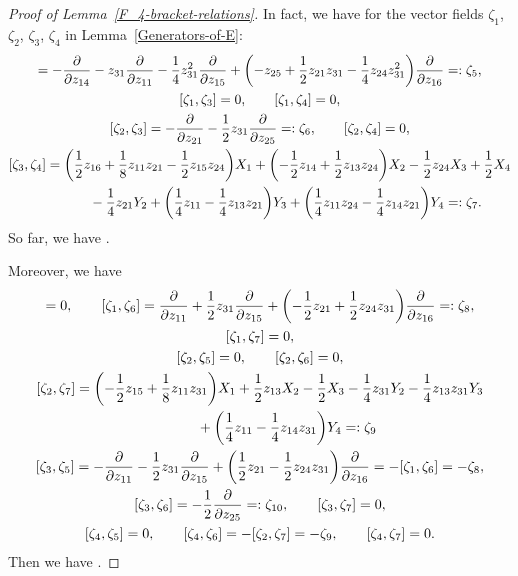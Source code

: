 \documentclass[pdftex]{sigma}
\numberwithin{equation}{section}
\theoremstyle{definition}
\newcommand{\0}{\boldsymbol{0}}
\newcommand{\pa}{\partial}
\newcommand{\rank}{\operatorname{rank}}
\begin{document}
\begin{proof}[Proof of Lemma~\ref{F_4-bracket-relations}]
In fact, we have for the vector fields $\zeta_1$, $\zeta_2$, $\zeta_3$, $\zeta_4$ in Lemma~\ref{Generators-of-E}:
\begin{gather*}
[\zeta_1, \zeta_2] = - \frac{\pa}{\pa z_{14}} - z_{31}\frac{\pa}{\pa z_{11}} - \frac{1}{4}z_{31}^2\frac{\pa}{\pa z_{15}}
+ \biggl(
- z_{25} + \frac{1}{2}z_{21}z_{31} - \frac{1}{4}z_{24}z_{31}^2\biggr)\frac{\pa}{\pa z_{16}} =: \zeta_5,
\\
[\zeta_1, \zeta_3] = 0,\qquad [\zeta_1, \zeta_4] = 0,
\\
[\zeta_2, \zeta_3] = - \frac{\pa}{\pa z_{21}} - \frac{1}{2}z_{31}\frac{\pa}{\pa z_{25}} =: \zeta_6,
\qquad
[\zeta_2, \zeta_4] = 0,
\\
[\zeta_3, \zeta_4] = \biggl(\frac{1}{2}z_{16} + \frac{1}{8}z_{11}z_{21} - \frac{1}{2}z_{15}z_{24}\biggr)X_1 +
\biggl(- \frac{1}{2}z_{14} + \frac{1}{2}z_{13}z_{24}\biggr)X_2 - \frac{1}{2}z_{24}X_3 + \frac{1}{2}X_4
\\
\hphantom{[\zeta_3, \zeta_4] =}{}
 - \frac{1}{4}z_{21}Y_2
+ \biggl(\frac{1}{4}z_{11} - \frac{1}{4}z_{13}z_{21}\biggr)Y_3 + \biggl(\frac{1}{4}z_{11}z_{24} - \frac{1}{4}z_{14}z_{21}\biggr)Y_4 =: \zeta_7.
\end{gather*}
So far, we have \smash{$\rank E^{(2)} = 7$}.

Moreover, we have
\begin{gather*}
[\zeta_1, \zeta_5] = 0,
\qquad
[\zeta_1, \zeta_6] = \frac{\pa}{\pa z_{11}} + \frac{1}{2}z_{31}\frac{\pa}{\pa z_{15}}
+ \biggl(-\frac{1}{2}z_{21} + \frac{1}{2}z_{24}z_{31}\biggr)\frac{\pa}{\pa z_{16}} =: \zeta_8,
\\
[\zeta_1, \zeta_7] = 0, \\
[\zeta_2, \zeta_5] = 0, \qquad [\zeta_2, \zeta_6] = 0,
\\
[\zeta_2, \zeta_7] = \biggl(-\frac{1}{2}z_{15} + \frac{1}{8}z_{11}z_{31}\biggr)X_1 +
\frac{1}{2}z_{13}X_2 - \frac{1}{2}X_3
- \frac{1}{4}z_{31}Y_2 - \frac{1}{4}z_{13}z_{31}Y_3
\\
\hphantom{[\zeta_2, \zeta_7] = }{}
+ \biggl(\frac{1}{4}z_{11} - \frac{1}{4}z_{14}z_{31}\biggr)Y_4 =: \zeta_9
\\
[\zeta_3, \zeta_5] = - \frac{\pa}{\pa z_{11}} - \frac{1}{2}z_{31}\frac{\pa}{\pa z_{15}}
+ \biggl(\frac{1}{2}z_{21} - \frac{1}{2}z_{24}z_{31}\biggr)\frac{\pa}{\pa z_{16}} = - [\zeta_1, \zeta_6] = - \zeta_8,
\\
[\zeta_3, \zeta_6] = -\frac{1}{2}\frac{\pa}{\pa z_{25}} =: \zeta_{10}, \qquad [\zeta_3, \zeta_7] = 0,
\\
[\zeta_4, \zeta_5] = 0,
\qquad
[\zeta_4, \zeta_6] = - [\zeta_2, \zeta_7] = - \zeta_9, \qquad [\zeta_4, \zeta_7] = 0.
\end{gather*}
Then we have \smash{$\rank E^{(3)} = 10$}.


\end{proof}
\end{document}
